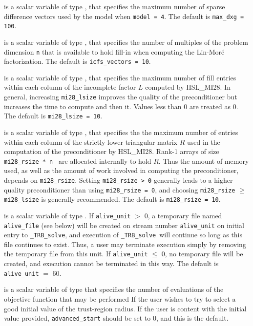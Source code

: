 \documentclass{galahad}
\newcommand{\packagename}{TRB}
\newcommand{\fullpackagename}{\libraryname\_\packagename}
\newcommand{\solver}{{\tt \fullpackagename\_solve}}
\begin{document}
\begin{description}
 is a scalar variable of type \integer,
that specifies the maximum number of sparse difference
vectors used by the model when {\tt model = 4}.
The default is {\tt max\_dxg = 100}.

 is a scalar variable of type \integer,
that specifies the number of multiples of the problem dimension {\tt n}
that is available to hold fill-in when computing the Lin-Mor\'{e}
factorization.
The default is {\tt icfs\_vectors = 10}.

 is a scalar variable of type \integer,
that specifies the maximum number of fill entries within each column
of the incomplete factor $L$ computed by HSL\_MI28. In general,
increasing {\tt mi28\_lsize} improves the quality of the preconditioner
but increases the time to compute and then it. Values less than 0 are
treated as 0.
The default is {\tt mi28\_lsize = 10}.

 is a scalar variable of type \integer,
that specifies the the maximum number of entries within each column of the
strictly lower triangular matrix $R$ used in the computation of the
preconditioner by HSL\_MI28.  Rank-1 arrays of size {\tt mi28\_rsize * n }
are allocated internally to hold $R$. Thus the amount of memory used, as well
as the amount of work involved in computing the preconditioner, depends on
{\tt mi28\_rsize}. Setting {\tt mi28\_rsize > 0} generally leads to a
higher quality preconditioner than using {\tt mi28\_rsize = 0}, and
choosing {\tt mi28\_rsize} $\geq$ {\tt mi28\_lsize} is generally
recommended.
The default is {\tt mi28\_rsize = 10}.


 is a scalar variable of type \integer.
If {\tt alive\_unit} $>$ 0, a temporary file named {\tt alive\_file} (see below)
will be created on stream number {\tt alive\_unit} on initial entry to
\solver, and execution of \solver\ will continue so
long as this file continues to exist. Thus, a user may terminate execution
simply by removing the temporary file from this unit.
If {\tt alive\_unit} $\leq$ 0, no temporary file will be created, and
execution cannot be terminated in this way.
The default is {\tt alive\_unit} $=$ 60.

 is a scalar variable of type \integer that
specifies the number of evaluations of the objective function that may
be performed If the user wishes to try to select a good initial value of the
trust-region radius. If the user is content with the initial value provided,
{\tt advanced\_start} should be set to 0, and this is the default.


\end{description}
\end{document}
